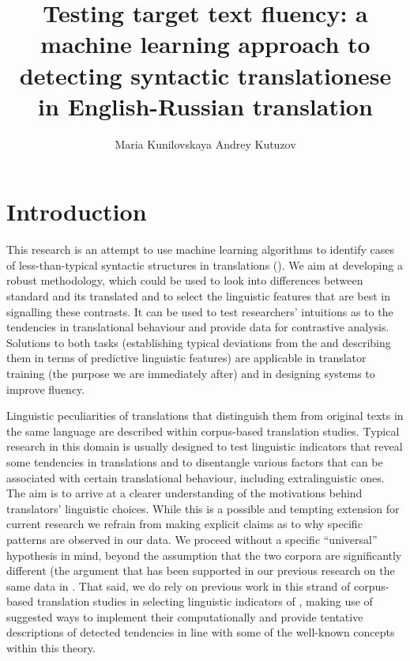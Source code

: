 \documentclass[output=paper]{langsci/langscibook.cls}
\author{Maria Kunilovskaya\affiliation{Tyumen State University}\lastand 
Andrey Kutuzov\affiliation{University of Oslo} 
}
\title{Testing target text fluency: a machine learning approach to detecting syntactic translationese in English-Russian translation}
\begin{document}
\maketitle
\section{Introduction}\label{sec:intro}

This research is an attempt to use machine learning algorithms to identify cases of less-than-typical syntactic structures in  translations (). We aim at developing a robust methodology, which could be used to look into differences between standard  and its translated  and to select the linguistic features that are best in signalling these contrasts. It can be used to test researchers' intuitions as to the tendencies in translational behaviour and provide data for contrastive analysis. Solutions to both tasks (establishing typical deviations from the  and describing them in terms of predictive linguistic features) are applicable in translator training (the purpose we are immediately after) and in designing  systems to improve fluency. 

Linguistic peculiarities of translations that distinguish them from original texts in the same language are described within corpus-based translation studies. Typical research in this domain is usually designed to test linguistic indicators that reveal some tendencies in translations and to disentangle various factors that can be associated with certain translational behaviour, including extralinguistic ones. The aim is to arrive at a clearer understanding of the motivations behind translators' linguistic choices. While this is a possible and tempting extension for current research we refrain from making explicit claims as to why specific patterns are observed in our data. We proceed without a specific ``universal'' hypothesis in mind, beyond the assumption that the two corpora are significantly different (the argument that has been supported in our previous research on the same data in \citet{Kunilovskaya:2015}. That said, we do rely on previous work in this strand of corpus-based translation studies in selecting linguistic indicators of , making use of suggested ways to implement their  computationally and provide tentative descriptions of detected tendencies in line with some of the well-known concepts within this theory.  
\end{document}
